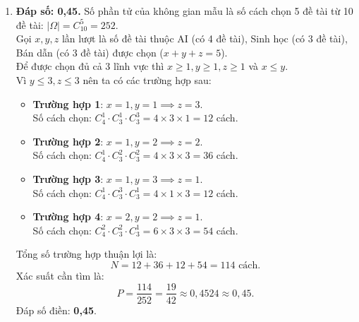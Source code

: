 \documentclass[12pt,a4paper]{article}
\begin{document}
\begin{enumerate}[label=\textbf{Câu \arabic*:}, leftmargin=*]
\item \textbf{Đáp số: 0,45.}
Số phần tử của không gian mẫu là số cách chọn 5 đề tài từ 10 đề tài: $|\Omega| = C_{10}^5 = 252$.\\
Gọi $x, y, z$ lần lượt là số đề tài thuộc AI (có 4 đề tài), Sinh học (có 3 đề tài), Bán dẫn (có 3 đề tài) được chọn ($x + y + z = 5$).\\
Để được chọn đủ cả 3 lĩnh vực thì $x \ge 1, y \ge 1, z \ge 1$ và $x \le y$.\\
Vì $y \le 3, z \le 3$ nên ta có các trường hợp sau:
\begin{itemize}
    \item \textbf{Trường hợp 1}: $x = 1, y = 1 \implies z = 3$.\\
    Số cách chọn: $C_4^1 \cdot C_3^1 \cdot C_3^3 = 4 \times 3 \times 1 = 12$ cách.
    \item \textbf{Trường hợp 2}: $x = 1, y = 2 \implies z = 2$.\\
    Số cách chọn: $C_4^1 \cdot C_3^2 \cdot C_3^2 = 4 \times 3 \times 3 = 36$ cách.
    \item \textbf{Trường hợp 3}: $x = 1, y = 3 \implies z = 1$.\\
    Số cách chọn: $C_4^1 \cdot C_3^3 \cdot C_3^1 = 4 \times 1 \times 3 = 12$ cách.
    \item \textbf{Trường hợp 4}: $x = 2, y = 2 \implies z = 1$.\\
    Số cách chọn: $C_4^2 \cdot C_3^2 \cdot C_3^1 = 6 \times 3 \times 3 = 54$ cách.
\end{itemize}
Tổng số trường hợp thuận lợi là:
$$N = 12 + 36 + 12 + 54 = 114\text{ cách}.$$
Xác suất cần tìm là:
$$P = \dfrac{114}{252} = \dfrac{19}{42} \approx 0{,}4524 \approx 0{,}45.$$
Đáp số điền: \textbf{0,45}.
\end{enumerate}
\end{document}

